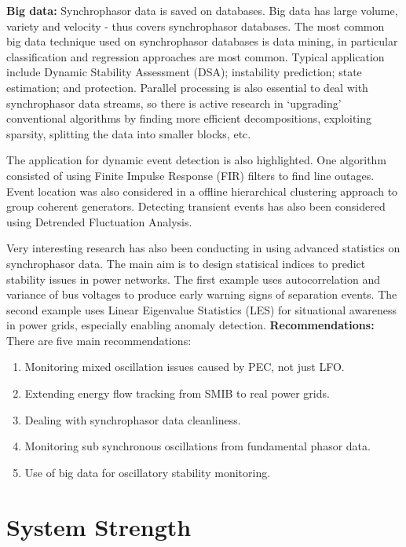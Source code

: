 \documentclass[12pt, a4paper]{report}
\begin{document}
\textbf{Big data:} Synchrophasor data is saved on databases. Big data has large volume, variety and velocity - thus covers synchrophasor databases. The most common big data technique used on synchrophasor databases is data mining, in particular classification and regression approaches are most common. Typical application include Dynamic Stability Assessment (DSA); instability prediction; state estimation; and protection. Parallel processing is also essential to deal with synchrophasor data streams, so there is active research in `upgrading' conventional algorithms by finding more efficient decompositions, exploiting sparsity, splitting the data into smaller blocks, etc.\par
The application for dynamic event detection is also highlighted. One algorithm consisted of using Finite Impulse Response (FIR) filters to find line outages. Event location was also considered in a offline hierarchical clustering approach to group coherent generators. Detecting transient events has also been considered using Detrended Fluctuation Analysis.\par
Very interesting research has also been conducting in using advanced statistics on synchrophasor data. The main aim is to design statisical indices to predict stability issues in power networks. The first example uses autocorrelation and variance of bus voltages to produce early warning signs of separation events. The second example uses Linear Eigenvalue Statistics (LES) for situational awareness in power grids, especially enabling anomaly detection.
\textbf{Recommendations:} There are five main recommendations:
\begin{enumerate}
	\item Monitoring mixed oscillation issues caused by PEC, not just LFO.
	\item Extending energy flow tracking from SMIB to real power grids.
	\item Dealing with synchrophasor data cleanliness.
	\item Monitoring sub synchronous oscillations from fundamental phasor data.
	\item Use of big data for oscillatory stability monitoring.
\end{enumerate} 
 


\chapter{System Strength}
\end{document}
